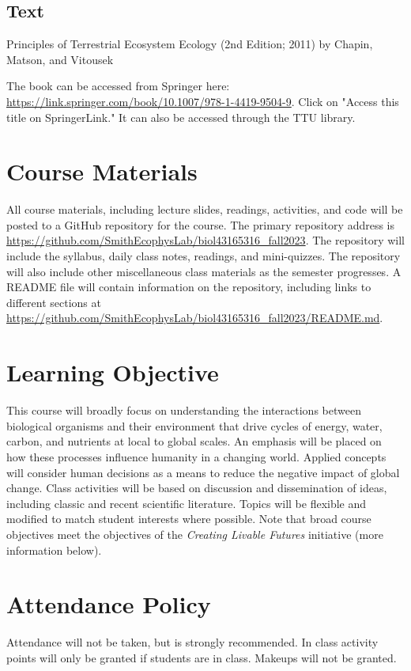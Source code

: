 \documentclass[12pt, notitlepage]{article}   	%
\begin{document}
{\subsection{Text}
Principles of Terrestrial Ecosystem Ecology (2nd Edition; 2011) 
by Chapin, Matson, and Vitousek \par
The book can be accessed from Springer here: 
\url{https://link.springer.com/book/10.1007/978-1-4419-9504-9}. Click on "Access this title on 
SpringerLink." It can also be accessed through the TTU library.

\section{Course Materials}
All course materials, including lecture slides, readings, activities, and code 
will be posted to a GitHub repository for the course.
The primary repository address is
\url{https://github.com/SmithEcophysLab/biol43165316_fall2023}.
The repository will include the syllabus, daily class notes, readings, and mini-quizzes.
The repository will also include other miscellaneous class materials as the semester
progresses. A README file will contain information on the repository, including
links to different sections at 
\url{https://github.com/SmithEcophysLab/biol43165316_fall2023/README.md}.

\section{Learning Objective}
This course will broadly focus on understanding the interactions between biological
organisms and their environment that drive cycles of energy, water, carbon, and nutrients
at local to global scales.
An emphasis will be placed on how these processes influence humanity in a changing world.
Applied concepts will consider human decisions as a means to reduce the negative impact
of global change. Class activities will be based on discussion and dissemination of ideas, 
including classic and recent scientific literature. 
Topics will be flexible and modified to match student interests where possible.
Note that broad course objectives meet the objectives of the \textit{Creating Livable Futures}
initiative (more information below).

\section{Attendance Policy}
Attendance will not be taken, but is strongly recommended. 
In class activity points will only be granted if students are in class.
Makeups will not be granted.

}
\end{document}
